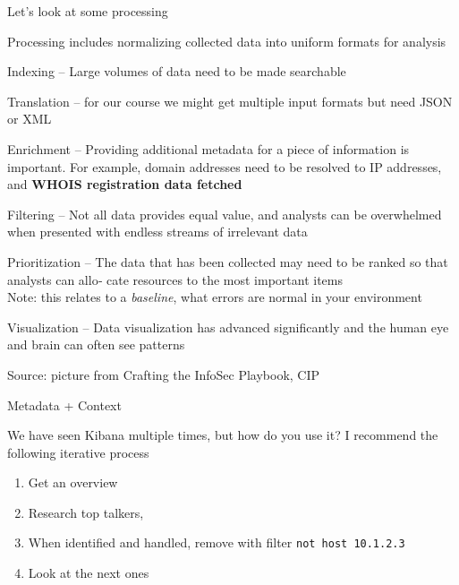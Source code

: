 \documentclass[Screen16to9,17pt]{foils}
\begin{document}

Let's look at some processing

\begin{list2}
\item Processing includes normalizing collected data into uniform formats for analysis
\item Indexing -- Large volumes of data need to be made searchable
\item Translation -- for our course we might get multiple input formats but need JSON or XML
\item Enrichment -- Providing additional metadata for a piece of information is important. For example, domain addresses need to be resolved to IP addresses, and {\bf WHOIS registration data fetched}
\item Filtering --
Not all data provides equal value, and analysts can be overwhelmed when presented with endless streams of irrelevant data
\item Prioritization --
The data that has been collected may need to be ranked so that analysts can allo‐
cate resources to the most important items\\
Note: this relates to a \emph{baseline}, what errors are normal in your environment
\item Visualization -- Data visualization has advanced significantly and the human eye and brain can often see patterns
\end{list2}




Source: picture from Crafting the InfoSec Playbook, CIP

Metadata + Context





\begin{quote}

\end{quote}

We have seen Kibana multiple times, but how do you use it? I recommend the following iterative process
\begin{enumerate}
\item Get an overview
\item Research top talkers,
\item When identified and handled, remove with filter \verb+not host 10.1.2.3+
\item Look at the next ones
\end{enumerate}
\end{document}
